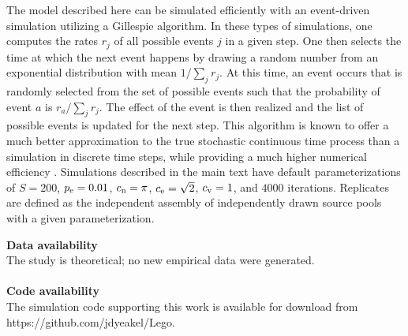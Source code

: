 \documentclass[twocolumn,preprintnumbers,amsmath,amssymb,superscriptaddress,linenumbers]{revtex4-1}
\begin{document}
{  The model described here can be simulated efficiently with an event-driven simulation utilizing a Gillespie algorithm.
  In these types of simulations, one computes the rates $r_j$ of all possible events $j$ in a given step.
  One then selects the time at which the next event happens by drawing a random number from an exponential distribution with mean $1/\sum_j{r_j}$.
  At this time, an event occurs that is randomly selected from the set of possible events such that the probability of event $a$ is $r_a/\sum_j{r_j}$.
  The effect of the event is then realized and the list of possible events is updated for the next step.
  This algorithm is known to offer a much better approximation to the true stochastic continuous time process than a simulation in discrete time steps, while providing a much higher numerical efficiency \cite{Gillespie1977}.
  Simulations described in the main text have default parameterizations of $S=200$, $p_{\rm e}=0.01$, $c_{\rm n} = \pi$, $c_{\rm e} = \sqrt{2}$, $c_{\rm v} = 1$, and $4000$ iterations.
  Replicates are defined as the independent assembly of independently drawn source pools with a given parameterization.}

\vspace{2mm}
\noindent \textbf{Data availability}\\
  \footnotesize{
  The study is theoretical; no new empirical data were generated.
  }\\ \\
\noindent \textbf{Code availability}\\
  \footnotesize{
  The simulation code supporting this work is available for download from https://github.com/jdyeakel/Lego.
  }\\


\end{document}
